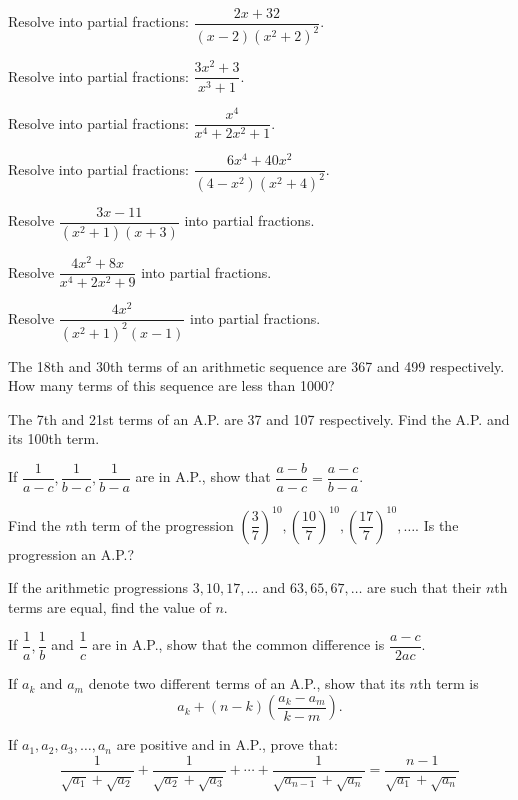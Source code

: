 \documentclass[11pt,a4paper]{article}
\begin{document}
\begin{longlist}
\item Resolve into partial fractions: $\dfrac{2x+32}{(x-2)(x^2+2)^2}$.

\item Resolve into partial fractions: $\dfrac{3x^2+3}{x^3+1}$.

\item Resolve into partial fractions: $\dfrac{x^4}{x^4+2x^2+1}$.

\item Resolve into partial fractions: $\dfrac{6x^4+40x^2}{(4-x^2)(x^2+4)^2}$.

\item Resolve $\dfrac{3x-11}{(x^2+1)(x+3)}$ into partial fractions.

\item Resolve $\dfrac{4x^2+8x}{x^4+2x^2+9}$ into partial fractions.

\item Resolve $\dfrac{4x^2}{(x^2+1)^2(x-1)}$ into partial fractions.

\item The 18th and 30th terms of an arithmetic sequence are 367 and 499 respectively. How many terms of this sequence are less than 1000?

\item The 7th and 21st terms of an A.P. are 37 and 107 respectively. Find the A.P. and its 100th term.

\item If $\dfrac{1}{a-c}, \dfrac{1}{b-c}, \dfrac{1}{b-a}$ are in A.P., show that $\dfrac{a-b}{a-c}=\dfrac{a-c}{b-a}$.

\item Find the $n$th term of the progression $\left(\dfrac{3}{7}\right)^{10}, \left(\dfrac{10}{7}\right)^{10}, \left(\dfrac{17}{7}\right)^{10}, \ldots$. Is the progression an A.P.?

\item If the arithmetic progressions $3,10,17,\ldots$ and $63,65,67,\ldots$ are such that their $n$th terms are equal, find the value of $n$.

\item If $\dfrac{1}{a}, \dfrac{1}{b}$ and $\dfrac{1}{c}$ are in A.P., show that the common difference is $\dfrac{a-c}{2ac}$.

\item If $a_k$ and $a_m$ denote two different terms of an A.P., show that its $n$th term is
\[
a_k+(n-k)\left(\frac{a_k-a_m}{k-m}\right).
\]

\item If $a_1,a_2,a_3,\ldots,a_n$ are positive and in A.P., prove that:
\[
\frac{1}{\sqrt{a_1}+\sqrt{a_2}}+\frac{1}{\sqrt{a_2}+\sqrt{a_3}}+\cdots+\frac{1}{\sqrt{a_{n-1}}+\sqrt{a_n}}=\frac{n-1}{\sqrt{a_1}+\sqrt{a_n}}
\]


\end{longlist}
\end{document}

